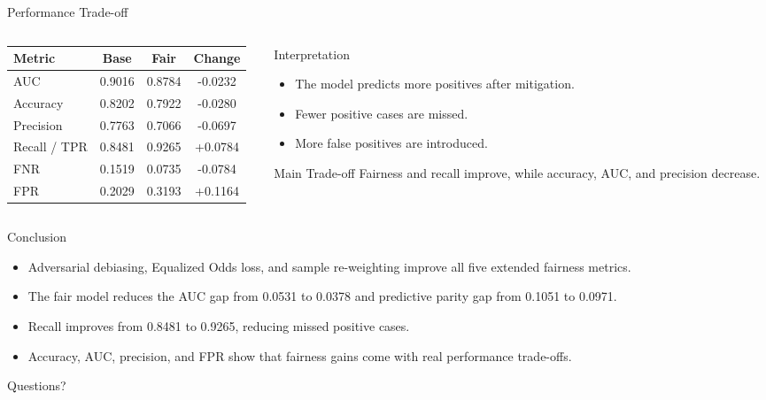 \documentclass[10pt,aspectratio=169]{beamer}
\begin{document}
\begin{frame}{Performance Trade-off}
  \begin{columns}[T,onlytextwidth]
    \begin{column}{0.52\textwidth}
      \begin{table}
        \small
        \begin{tabular}{lccc}
          \toprule
          Metric & Base & Fair & Change \\
          \midrule
          AUC & 0.9016 & 0.8784 & -0.0232 \\
          Accuracy & 0.8202 & 0.7922 & -0.0280 \\
          Precision & 0.7763 & 0.7066 & -0.0697 \\
          Recall / TPR & 0.8481 & 0.9265 & +0.0784 \\
          FNR & 0.1519 & 0.0735 & -0.0784 \\
          FPR & 0.2029 & 0.3193 & +0.1164 \\
          \bottomrule
        \end{tabular}
      \end{table}
    \end{column}
    \begin{column}{0.44\textwidth}
      \begin{block}{Interpretation}
        \begin{itemize}
          \item The model predicts more positives after mitigation.
          \item Fewer positive cases are missed.
          \item More false positives are introduced.
        \end{itemize}
      \end{block}
      \begin{alertblock}{Main Trade-off}
        Fairness and recall improve, while accuracy, AUC, and precision decrease.
      \end{alertblock}
    \end{column}
  \end{columns}
\end{frame}



\begin{frame}{Conclusion}
  \begin{itemize}
    \item Adversarial debiasing, Equalized Odds loss, and sample re-weighting improve all five extended fairness metrics.
    \item The fair model reduces the AUC gap from 0.0531 to 0.0378 and predictive parity gap from 0.1051 to 0.0971.
    \item Recall improves from 0.8481 to 0.9265, reducing missed positive cases.
    \item Accuracy, AUC, precision, and FPR show that fairness gains come with real performance trade-offs.
  \end{itemize}

  \vfill
  \begin{center}
    \Large Questions?
  \end{center}
\end{frame}
\end{document}
